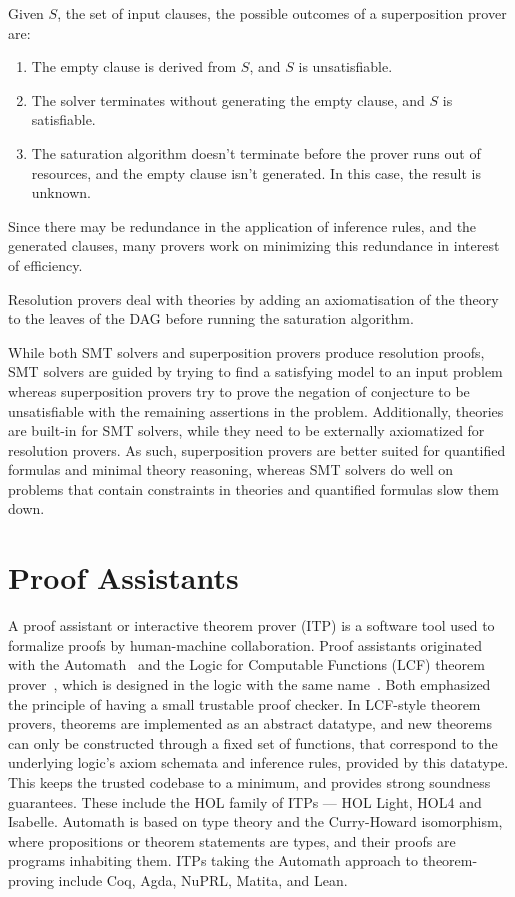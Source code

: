 \documentclass{article}
\begin{document}
	Given $S$, the set of input clauses, the possible 
	outcomes of a superposition prover are:
	\begin{enumerate}
		\item The empty clause is derived from $S$, and
		$S$ is unsatisfiable.
		\item The solver terminates without generating the 
		empty clause, and $S$ is satisfiable.
		\item The saturation algorithm doesn't terminate 
		before the prover runs out of resources, and 
		the empty clause isn't generated. In this 
		case, the result is unknown. 
	\end{enumerate}
	
	Since there may be redundance in the application 
	of inference rules, and the generated clauses, 
	many provers work on minimizing this redundance in 
	interest of efficiency.
	
	Resolution provers deal with theories by 
	adding an axiomatisation of the theory to the 
	leaves of the DAG before running the 
	saturation algorithm.
	
	While both SMT solvers and superposition provers 
	produce resolution proofs, SMT solvers are guided 
	by trying to find a satisfying model to an input 
	problem whereas superposition provers try 
	to prove the negation of conjecture to be unsatisfiable
	with the remaining assertions in the problem. 
	Additionally, theories are built-in for SMT solvers,
	while they need to be externally axiomatized for 
	resolution provers. As such, superposition provers
	are better suited for quantified formulas and 
	minimal theory reasoning, whereas SMT solvers 
	do well on problems that contain constraints 
	in theories and quantified formulas slow them 
	down.
	
\section{Proof Assistants}
\label{sec:itp}
	A proof assistant or interactive theorem prover 
	(ITP) is a software tool used to formalize
	proofs by human-machine collaboration.
	Proof assistants originated with the 
	Automath~\cite{10.1007/BFb0060623} and 
	the Logic for Computable Functions (LCF) 
	theorem prover~\cite{10.5555/891954}, 
	which is designed in the logic with the 
	same name~\cite{Loeckx1987}. Both emphasized the 
	principle of having a small trustable proof 
	checker. In LCF-style theorem provers, theorems 
	are implemented as an abstract datatype, and 
	new theorems can only be constructed through a 
	fixed set of functions, that correspond to the 
	underlying logic's axiom schemata and inference 
	rules, provided by this datatype. This keeps
	the trusted codebase to a minimum, and 
	provides strong soundness guarantees. These 
	include the HOL family of ITPs --- HOL Light, 
	HOL4 and Isabelle. Automath is based on type 
	theory and the Curry-Howard isomorphism, where 
	propositions or theorem statements are types, 
	and their proofs are programs inhabiting them. 
	ITPs taking the Automath approach to 
	theorem-proving include Coq, Agda, NuPRL, 
	Matita, and Lean.
	
\end{document}

